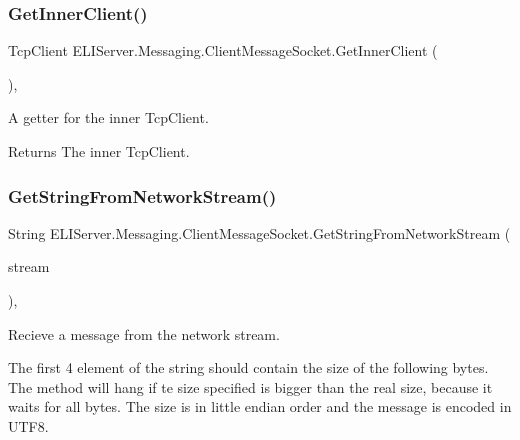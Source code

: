 \subsubsection{\texorpdfstring{Get\+Inner\+Client()}{GetInnerClient()}}
{\footnotesize\ttfamily Tcp\+Client E\+L\+I\+Server.\+Messaging.\+Client\+Message\+Socket.\+Get\+Inner\+Client (\begin{DoxyParamCaption}{ }\end{DoxyParamCaption})\hspace{0.3cm}{\ttfamily [inline]}, {\ttfamily [package]}}



A getter for the inner Tcp\+Client. 

\begin{DoxyReturn}{Returns}
The inner Tcp\+Client.
\end{DoxyReturn}
\mbox{\label{class_e_l_i_server_1_1_messaging_1_1_client_message_socket_af243c323ef5f9a2e49b4ea5eb8de1dab}} 
\subsubsection{\texorpdfstring{Get\+String\+From\+Network\+Stream()}{GetStringFromNetworkStream()}}
{\footnotesize\ttfamily String E\+L\+I\+Server.\+Messaging.\+Client\+Message\+Socket.\+Get\+String\+From\+Network\+Stream (\begin{DoxyParamCaption}\item[{Network\+Stream}]{stream }\end{DoxyParamCaption})\hspace{0.3cm}{\ttfamily [inline]}, {\ttfamily [private]}}





Recieve a message from the network stream.

The first 4 element of the string should contain the size of the following bytes. The method will hang if te size specified is bigger than the real size, because it waits for all bytes. The size is in little endian order and the message is encoded in U\+T\+F8. 


